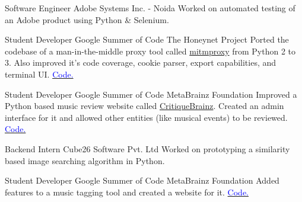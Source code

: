     {Software Engineer}
    {Adobe Systems Inc. - Noida}
    {}
    {}
    {
        Worked on automated testing of an Adobe product using Python \& Selenium.
    }
    \vspace*{0.2\baselineskip}

    {Student Developer}
    {Google Summer of Code}
    {The Honeynet Project}
    {}
    {
        Ported the codebase of a man-in-the-middle proxy tool called \href{http://github.com/mitmproxy/mitmproxy/}{mitmproxy} from Python 2 to 3. Also improved it's
        code coverage,
        cookie parser,
        export capabilities,
        and terminal UI.
        \hfill
        \href{https://github.com/mitmproxy/mitmproxy/commits?author=dufferzafar}{\textcolor{blue}{\scriptsize Code.}}
    }
    \vspace*{0.2\baselineskip}

    {Student Developer}
    {Google Summer of Code}
    {MetaBrainz Foundation}
    {}
    {
        Improved a Python based music review website called \href{http://critiquebrainz.org/}{CritiqueBrainz}.
        Created an admin interface for it
        and allowed other entities (like musical events) to be reviewed.
        \hfill
        \href{https://github.com/metabrainz/critiquebrainz/commits?author=dufferzafar}{\textcolor{blue}{\scriptsize Code.}}
    }
    \vspace*{0.2\baselineskip}

    {Backend Intern}
    {Cube26 Software Pvt. Ltd}
    {}
    {}
    {
        Worked on prototyping a similarity based image searching algorithm in Python.
    }
    \vspace*{0.2\baselineskip}

    {Student Developer}
    {Google Summer of Code}
    {MetaBrainz Foundation}
    {}
    {
        Added features to a music tagging tool and created a website for it.
        \hfill
        \href{https://github.com/metabrainz/picard-website/commits?author=dufferzafar}{\textcolor{blue}{\scriptsize Code.}}
    }
    \vspace*{0.2\baselineskip}

